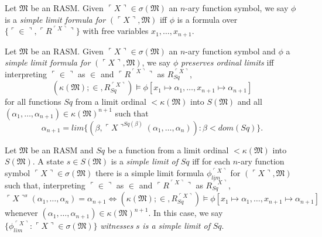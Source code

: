 \documentclass[12pt]{article}
\numberwithin{equation}{section}
\begin{document}
\begin{defi}
Let $\mathfrak{M}$ be an RASM. Given $\ulcorner X \urcorner \in \sigma(\mathfrak{M})$ an $n$-ary function symbol, we say $\phi$ is a \emph{simple limit formula for} $(\ulcorner X \urcorner, \mathfrak{M})$ iff $\phi$ is a formula over $\{\ulcorner \in \urcorner, \ulcorner R^{\ulcorner X \urcorner} \urcorner\}$ with free variables $x_1, \dots, x_{n+1}$.
\end{defi}

\begin{defi}\label{def234c}
Let $\mathfrak{M}$ be an RASM. Given $\ulcorner X \urcorner \in \sigma(\mathfrak{M})$ an $n$-ary function symbol and $\phi$ a \emph{simple limit formula for} $(\ulcorner X \urcorner, \mathfrak{M})$, we say $\phi$ \emph{preserves ordinal limits} iff interpreting $\ulcorner \in \urcorner$ as $\in$ and $\ulcorner R^{\ulcorner X \urcorner} \urcorner$ as $R_{Sq}^{\ulcorner X \urcorner}$, 
\begin{equation*}
    (\kappa(\mathfrak{M}); \in, R_{Sq}^{\ulcorner X \urcorner}) \models \phi[x_1 \mapsto \alpha_1, \dots, x_{n+1} \mapsto \alpha_{n+1}]
\end{equation*}
for all functions $Sq$ from a limit ordinal $< \kappa(\mathfrak{M})$ into $S(\mathfrak{M})$ and all $(\alpha_1, \dots, \alpha_{n+1}) \in \kappa(\mathfrak{M})^{n+1}$ such that 
\begin{equation*}
    \alpha_{n+1} = lim \{(\beta, \ulcorner X \urcorner^{Sq(\beta)}(\alpha_1, \dots, \alpha_n)) : \beta < dom(Sq)\} \text{.}
\end{equation*}
\end{defi}

\begin{defi}\label{def234}
Let $\mathfrak{M}$ be an RASM and $Sq$ be a function from a limit ordinal $< \kappa(\mathfrak{M})$ into $S(\mathfrak{M})$. A state $s \in S(\mathfrak{M})$ is a \emph{simple limit of} $Sq$ iff for each $n$-ary function symbol $\ulcorner X \urcorner \in \sigma(\mathfrak{M})$ there is a simple limit formula $\phi_{lim}^{\ulcorner X \urcorner}$ for $(\ulcorner X \urcorner, \mathfrak{M})$ such that, interpreting $\ulcorner \in \urcorner$ as $\in$ and $\ulcorner R^{\ulcorner X \urcorner} \urcorner$ as $R_{Sq}^{\ulcorner X \urcorner}$, 
\begin{equation*}
    \ulcorner X \urcorner^s (\alpha_1, \dots, \alpha_n) = \alpha_{n+1} \iff (\kappa(\mathfrak{M}); \in, R_{Sq}^{\ulcorner X \urcorner}) \models \phi[x_1 \mapsto \alpha_1, \dots, x_{n+1} \mapsto \alpha_{n+1}]
\end{equation*}
whenever $(\alpha_1, \dots, \alpha_{n+1}) \in \kappa(\mathfrak{M})^{n+1}$. In this case, we say $\{\phi_{lim}^{\ulcorner X \urcorner} : \ulcorner X \urcorner \in \sigma(\mathfrak{M})\}$ \emph{witnesses} $s$ \emph{is a simple limit of} $Sq$.
\end{defi}
\end{document}
